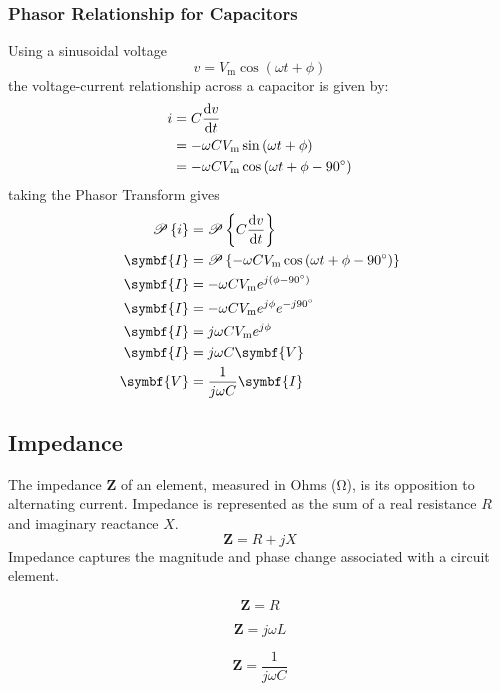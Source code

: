 \documentclass{article}
\begin{document}
\subsubsection{Phasor Relationship for Capacitors}
Using a sinusoidal voltage
\begin{equation*}
    v = V_{\mathrm{m}}\cos{\left( \omega t + \phi \right)}
\end{equation*}
the voltage-current relationship across a capacitor is given by:
\begin{align*}
    i &= C \dv{v}{t} \\
    &= -\omega C V_{\mathrm{m}} \sin{\left( \omega t + \phi \right)} \\
    &= -\omega C V_{\mathrm{m}} \cos{\left( \omega t + \phi - \SI{90}{\degree} \right)}
\end{align*} 
taking the Phasor Transform gives
\begin{align*}
    \mathscr{P}\left\{ i \right\} &= \mathscr{P}\left\{ C \dv{v}{t} \right\} \\
    \symbf{I} &= \mathscr{P}\left\{ -\omega C V_{\mathrm{m}} \cos{\left( \omega t + \phi - \SI{90}{\degree} \right)} \right\} \\
    \symbf{I} &= -\omega C V_{\mathrm{m}} \e^{j\left( \phi - \SI{90}{\degree} \right)} \\
    \symbf{I} &= -\omega C V_{\mathrm{m}} \e^{j \phi} \e^{-j\SI{90}{\degree}} \\
    \symbf{I} &= j\omega C V_{\mathrm{m}} \e^{j \phi} \\
    \symbf{I} &= j\omega C \symbf{V} \\
    \symbf{V} &= \frac{1}{j\omega C} \symbf{I} 
\end{align*}
\subsection{Impedance}
\begin{definition}
    The impedance $\symbf{Z}$ of an element, measured in Ohms (\si{\ohm}), is its opposition to alternating current.
    Impedance is represented as the sum of a real resistance $R$ and imaginary reactance $X$.
    \begin{equation*}
        \symbf{Z} = R + jX
    \end{equation*}
    Impedance captures the magnitude and phase change associated with a circuit element.
\end{definition}
\begin{theorem}
    \begin{equation*}
        \symbf{Z} = R
    \end{equation*}
\end{theorem}
\begin{theorem}
    \begin{equation*}
        \symbf{Z} = j\omega L
    \end{equation*}
\end{theorem}
\begin{theorem}
    \begin{equation*}
        \symbf{Z} = \frac{1}{j\omega C}
    \end{equation*}
\end{theorem}
\end{document}
